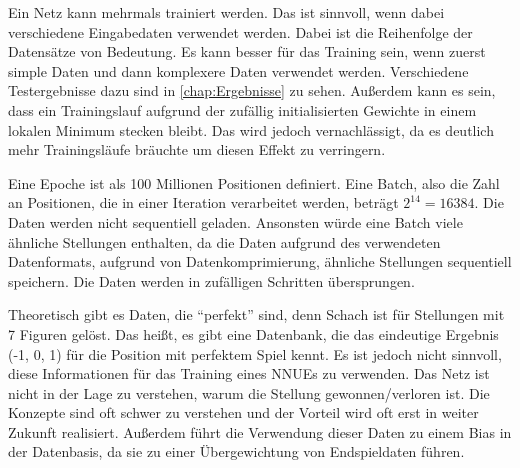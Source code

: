 Ein Netz kann mehrmals trainiert werden. Das ist sinnvoll, wenn dabei verschiedene Eingabedaten verwendet werden. Dabei ist die Reihenfolge der Datensätze von Bedeutung. Es kann besser für das Training sein, wenn zuerst simple Daten und dann komplexere Daten verwendet werden. Verschiedene Testergebnisse dazu sind in \autoref{chap:Ergebnisse} zu sehen. Außerdem kann es sein, dass ein Trainingslauf aufgrund der zufällig initialisierten Gewichte in einem lokalen Minimum stecken bleibt. Das wird jedoch vernachlässigt, da es deutlich mehr Trainingsläufe bräuchte um diesen Effekt zu verringern.

Eine Epoche ist als 100 Millionen Positionen definiert. Eine Batch, also die Zahl an Positionen, die in einer Iteration verarbeitet werden, beträgt $2^{14}=16384$. Die Daten werden nicht sequentiell geladen. Ansonsten würde eine Batch viele ähnliche Stellungen enthalten, da die Daten aufgrund des verwendeten Datenformats, aufgrund von Datenkomprimierung, ähnliche Stellungen sequentiell speichern. Die Daten werden in zufälligen Schritten übersprungen.




Theoretisch gibt es Daten, die \enquote{perfekt} sind, denn Schach ist für Stellungen mit 7 Figuren gelöst. Das heißt, es gibt eine Datenbank, die das eindeutige Ergebnis (-1, 0, 1) für die Position mit perfektem Spiel kennt. Es ist jedoch nicht sinnvoll, diese Informationen für das Training eines \acp{NNUE} zu verwenden. Das Netz ist nicht in der Lage zu verstehen, warum die Stellung gewonnen/verloren ist. Die Konzepte sind oft schwer zu verstehen und der Vorteil wird oft erst in weiter Zukunft realisiert. Außerdem führt die Verwendung dieser Daten zu einem Bias in der Datenbasis, da sie zu einer Übergewichtung von Endspieldaten führen.


